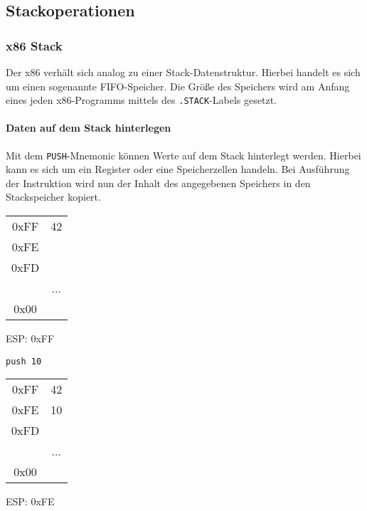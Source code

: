 \subsection{Stackoperationen}
\subsubsection{x86 Stack}
Der x86 verhält sich analog zu einer Stack-Datenstruktur. Hierbei handelt es sich um einen sogenannte FIFO-Speicher.
Die Größe des Speichers wird am Anfang eines jeden x86-Programms mittels des \texttt{.STACK}-Labels gesetzt.


\paragraph{Daten auf dem Stack hinterlegen\newline} 
Mit dem \texttt{PUSH}-Mnemonic können Werte auf dem Stack hinterlegt werden.
Hierbei kann es sich um ein Register oder eine Speicherzellen handeln.
Bei Ausführung der Instruktion wird nun der Inhalt des angegebenen Speichers in den Stackspeicher kopiert. 

\begin{multicols}{3}
\begin{tabular}{c|c|}
	\cline{2-2}
   0xFF & 42\\ \cline{2-2}
   0xFE & \\ \cline{2-2}
   0xFD & \\ \cline{2-2}
	      & ... \\ \cline{2-2}
	 0x00 & \\ \cline{2-2}
\end{tabular}
ESP: 0xFF

\begin{verbatim}push 10\end{verbatim}

\begin{tabular}{c|c|}
	\cline{2-2}
   0xFF & 42\\ \cline{2-2}
   0xFE & 10\\ \cline{2-2}
   0xFD & \\ \cline{2-2}
	      & ... \\ \cline{2-2}
	 0x00 & \\ \cline{2-2}
\end{tabular}
ESP: 0xFE
\end{multicols}


